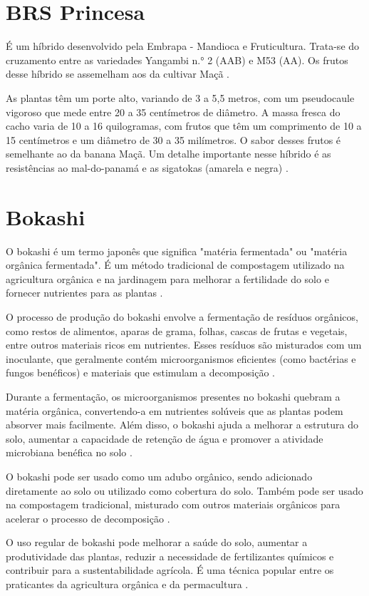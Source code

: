 \section{BRS Princesa}
É um híbrido desenvolvido pela Embrapa - Mandioca e Fruticultura. Trata-se do cruzamento entre as variedades Yangambi n.° 2 (AAB) e M53 (AA). Os frutos desse híbrido se assemelham aos da cultivar Maçã \cite{cultivodebananeira}. 

As plantas têm um porte alto, variando de 3 a 5,5 metros, com um pseudocaule vigoroso que mede entre 20 a 35 centímetros de diâmetro. A massa fresca do cacho varia de 10 a 16 quilogramas, com frutos que têm um comprimento de 10 a 15 centímetros e um diâmetro de 30 a 35 milímetros. O sabor desses frutos é semelhante ao da banana Maçã. Um detalhe importante nesse híbrido é as resistências ao mal-do-panamá e as sigatokas (amarela e negra) \cite{cultivodebananeira}.


\section{Bokashi}
O bokashi é um termo japonês que significa "matéria fermentada" ou "matéria orgânica fermentada". É um método tradicional de compostagem utilizado na agricultura orgânica e na jardinagem para melhorar a fertilidade do solo e fornecer nutrientes para as plantas \cite{bokashi1}.

O processo de produção do bokashi envolve a fermentação de resíduos orgânicos, como restos de alimentos, aparas de grama, folhas, cascas de frutas e vegetais, entre outros materiais ricos em nutrientes. Esses resíduos são misturados com um inoculante, que geralmente contém microorganismos eficientes (como bactérias e fungos benéficos) e materiais que estimulam a decomposição \cite{bokashi1,bokashi3}.

Durante a fermentação, os microorganismos presentes no bokashi quebram a matéria orgânica, convertendo-a em nutrientes solúveis que as plantas podem absorver mais facilmente. Além disso, o bokashi ajuda a melhorar a estrutura do solo, aumentar a capacidade de retenção de água e promover a atividade microbiana benéfica no solo \cite{bokashi1}.

O bokashi pode ser usado como um adubo orgânico, sendo adicionado diretamente ao solo ou utilizado como cobertura do solo. Também pode ser usado na compostagem tradicional, misturado com outros materiais orgânicos para acelerar o processo de decomposição \cite{bokashi1,Hafle2009}.

O uso regular de bokashi pode melhorar a saúde do solo, aumentar a produtividade das plantas, reduzir a necessidade de fertilizantes químicos e contribuir para a sustentabilidade agrícola. É uma técnica popular entre os praticantes da agricultura orgânica e da permacultura \cite{bokashi2}.

